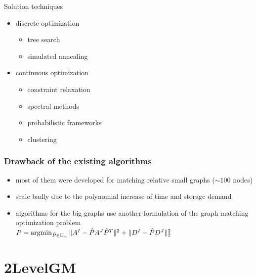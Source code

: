 \documentclass[hyperref={pdfpagelabels=false}]{beamer}
\def\argmin{\mathop{\rm argmin}}						%
\begin{document}
\begin{frame} [allowframebreaks]
Solution techniques~\cite{Conte2004}
\begin{itemize}
\item discrete optimization
	\begin{itemize}
	\item tree search~\cite{Bunke1983_inexactGM,Shapiro1981,Fu1979,Wang1995}
	\item simulated annealing~\cite{Herault1990_SimulatedAnnealing}
	\end{itemize} 
\item continuous optimization
	\begin{itemize}
		\item constraint relaxation~\cite{Rangarajan1996_GAGM,Leordeanu2009_IPFP,FastPFP,Vogelstein_BrainGraphs,Zazlavskiy2008_PATH}
		\item spectral methods~\cite{Leordeanu2005_SM,Umeyam1988}
		\item probabilistic frameworks~\cite{Armiti2014,Hancock_Kittler,Hancock_EM_SVD,Sanrom2012}
		\item clustering~\cite{Hancock_ModalClusters,Cho2009_AgglClustering,Hancock_GM_SpectralPart,Lyzinski2015}
	\end{itemize} 
\end{itemize}
\end{frame}
\begin{frame}
\frametitle{Drawback of the existing algorithms}

\begin{itemize}
\item most of them were developed for matching relative small graphs ($\sim 100$ nodes)
\item scale badly due to the polynomial increase of time and storage demand
\item algorithms for the big graphs use another formulation of the graph matching optimization problem\\
\vspace{5pt}
{\centering
$P = \argmin_{\hat{P}\in\Pi_n}\|A^I-\hat{P}A^J\hat{P}^T\|^2+\|D^I-\hat{P}D^J\|^2_2$}
\end{itemize}

\end{frame}
\section{2LevelGM}
\end{document}
